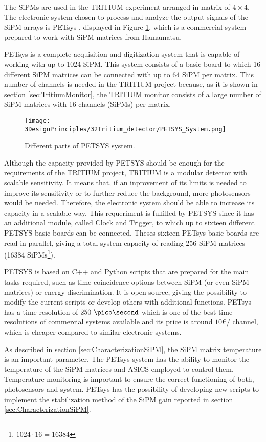 The SiPMs are used in the TRITIUM experiment arranged in matrix of $4\times 4$. The electronic system chosen to process and analyze the output signals of the SiPM arrays is PETsys \cite{PETSYS}, displayed in Figure \ref{fig:PETSYS}, which is a commercial system prepared to work with SiPM matrices from Hamamatsu.

PETsys is a complete acquisition and digitization system that is capable of working with up to 1024 SiPM. This system consists of a basic board to which 16 different SiPM matrices can be connected with up to 64 SiPM per matrix. This number of channels is needed in the TRITIUM project because, as it is shown in section \ref{sec:TritiumMonitor}, the TRITIUM monitor consists of a large number of SiPM matrices with 16 channels (SiPMs) per matrix.

\begin{figure}[h]
\centering
\texttt{[image: 3DesignPrinciples/32Tritium\_detector/PETSYS\_System.png]}
\caption{Different parts of PETSYS system.\label{fig:PETSYS}~\cite{PETSYS}}
\end{figure}

Although the capacity provided by PETSYS should be enough for the requirements of the TRITIUM project, TRITIUM is a modular detector with scalable sensitivity. It means that, if an inprovement of its limits is needed to improve its sensitivity or to further reduce the background, more photosensors would be needed. Therefore, the electronic system should be able to increase its capacity in a scalable way. This requeriment is fulfilled by PETSYS since it has an additional module, called Clock and Trigger, to which up to sixteen different PETSYS basic boards can be connected. Theses sixteen PETsys basic boards are read in parallel, giving a total system capacity of reading 256 SiPM matrices (16384 SiPMs\footnote{$1024\cdot{}16 = 16384$}). 

PETSYS is based on C++ and Python scripts that are prepared for the main tasks required, such as time coincidence options between SiPM (or even SiPM matrices) or energy discrimination. It is open source, giving the possibility to modify the current scripts or develop others with additional functions. PETsys has a time resolution of $250~\pico\second$ which is one of the best time resolutions of commercial systems available and its price is around $10$\euro$/$ channel, which is cheaper compared to similar electronic systems.

As described in section \ref{sec:CharacterizationSiPM}, the SiPM matrix temperature is an important parameter. The PETsys system has the ability to monitor the temperature of the SiPM matrices and ASICS employed to control them. Temperature monitoring is important to ensure the correct functioning of both, photosensors and system. PETsys has the possibility of developing new scripts to implement the stabilization method of the SiPM gain reported in section \ref{sec:CharacterizationSiPM}.

